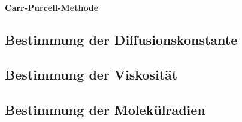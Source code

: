 \paragraph{Carr-Purcell-Methode}
\subsection{Bestimmung der Diffusionskonstante}
\subsection{Bestimmung der Viskosität}
\subsection{Bestimmung der Molekülradien}
